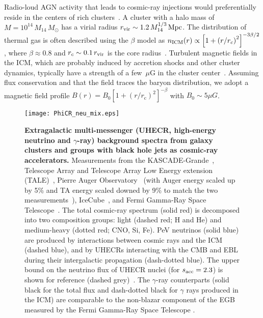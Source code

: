 \documentclass[aps,prd,onecolumn,superscriptaddress,11pt]{revtex4}
\begin{document}
Radio-loud AGN activity that leads to cosmic-ray injections would preferentially reside in the centers of rich clusters~\cite{2007MNRAS.379..894B}.  
A cluster with a halo mass of $M=10^{14}\,M_{14}\,M_\odot$ has a virial radius $r_{\rm vir}\sim 1.2\,M_{14}^{1/3}\,\rm Mpc$.  The distribution of thermal gas is often described using the $\beta$ model as $n_{\rm ICM}(r)\propto\left[1+\left({r}/{r_c}\right)^2\right]^{-3\beta/2}$, where $\beta\approx0.8$ and $r_c\sim0.1\,r_{\rm vir}$ is the core radius~\cite{2014IJMPD..2330007B}. 
Turbulent magnetic fields in the ICM, which are probably induced by accretion shocks and other cluster dynamics, typically have a strength of a few~$\mu$G in the cluster center~\cite{2014IJMPD..2330007B}.  Assuming flux conservation and that the field traces the baryon distribution, we adopt a magnetic field profile $B(r)=B_0\left[1+\left( {r}/{r_{\mathrm{c}}}\right)^2\right]^{-\beta}$ with $B_0\sim 5\mu G$. 

\begin{figure}
\centering\texttt{[image: PhiCR\_neu\_mix.eps]}
\caption{\label{fig:spectrum} \small {\bf Extragalactic multi-messenger (UHECR, high-energy neutrino and $\gamma$-ray) background spectra from galaxy clusters and groups with black hole jets as cosmic-ray accelerators.} Measurements from the KASCADE-Grande~\cite{::2013dga}, Telescope Array and Telescope Array Low Energy extension (TALE)~\cite{TA_ICRC15}, Pierre Auger Observatory~\cite{Aab:2015bza} (with Auger energy scaled up by 5\% and TA energy scaled downed by 9\% to match the two measurements~\cite{2017arXiv170509111V}), IceCube~\cite{Aartsen:2016xlq, Aartsen:2016xlq2}, and Fermi Gamma-Ray Space Telescope~\cite{FermiBG,PhysRevLett.116.151105}. The total cosmic-ray spectrum (solid red) is decomposed into two composition groups: light (dashed red; H and He) and medium-heavy (dotted red; CNO, Si, Fe).  
PeV neutrinos (solid blue) are produced by interactions between cosmic rays and the ICM (dashed blue), and by UHECRs interacting with the CMB and EBL during their intergalactic propagation (dash-dotted blue).  The upper bound on the neutrino flux of UHECR nuclei (for $s_{\rm acc}=2.3$) is shown for reference (dashed grey)~\cite{2010PhRvD..81l3001M}. 
The $\gamma$-ray counterparts (solid black for the total flux and dash-dotted black for $\gamma$ rays produced in the ICM) are comparable to the non-blazar component of the EGB measured by the Fermi Gamma-Ray Space Telescope \cite{PhysRevLett.116.151105}.}
\end{figure}
\end{document}
